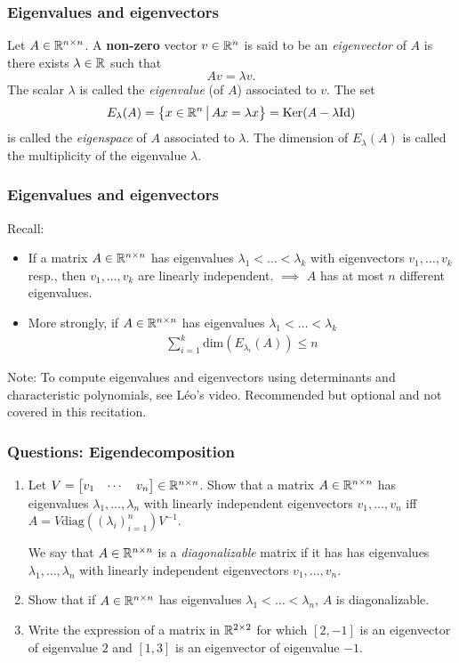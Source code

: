 \documentclass{beamer}
\begin{document}
\begin{frame}[t]
\frametitle{Eigenvalues and eigenvectors}
\begin{definition}\label{def:eigen}
	Let $A \in \mathbb{R}^{n \times n}$. A \textbf{non-zero} vector $v \in \mathbb{R}^n$ is said to be an \emph{eigenvector} of $A$ is there exists $\lambda \in \mathbb{R}$ such that
	$$
	A v = \lambda v.
	$$
	The scalar $\lambda$ is called the \emph{eigenvalue} (of $A$) associated to $v$. The set
	$$
	E_{\lambda}(A) = \big\{ x \in \mathbb{R}^n \, \big| \, Ax = \lambda x \big\} = {{\rm Ker}}(A-\lambda {{\rm Id}})
	$$
	is called the \emph{eigenspace} of $A$ associated to $\lambda$. The dimension of $E_{\lambda}(A)$ is called the multiplicity of the eigenvalue $\lambda$.
\end{definition}
\end{frame}

\begin{frame}[t]
\frametitle{Eigenvalues and eigenvectors}
Recall: 
\begin{itemize}
\item If a matrix $A \in \mathbb{R}^{n \times n}$ has eigenvalues $\lambda_1 < \dots < \lambda_k$ with eigenvectors $v_1, \dots, v_k$ resp., then $v_1, \dots, v_k$ are linearly independent. $\implies$ $A$ has at most $n$ different eigenvalues.
\item More strongly, if $A \in \mathbb{R}^{n \times n}$ has eigenvalues $\lambda_1 < \dots < \lambda_k$
\begin{align*}
\sum_{i=1}^k \text{dim}(E_{\lambda_i}(A)) \leq n
\end{align*}
\end{itemize}
Note: To compute eigenvalues and eigenvectors using determinants and characteristic polynomials, see L\'eo's video. Recommended but optional and not covered in this recitation.
\end{frame}

\begin{frame}[t]
\frametitle{Questions: Eigendecomposition}
\begin{enumerate}
\item Let $V = \begin{bmatrix} v_1 & \cdots & v_n \end{bmatrix} \in \mathbb{R}^{n \times n}$. Show that a matrix $A \in \mathbb{R}^{n \times n}$ has eigenvalues $\lambda_1, \dots, \lambda_n$ with linearly independent eigenvectors $v_1, \dots, v_n$ iff $A = V \text{diag}((\lambda_i)_{i=1}^n) V^{-1}$.
\begin{definition}
We say that $A \in \mathbb{R}^{n \times n}$ is a \emph{diagonalizable} matrix if it has has eigenvalues $\lambda_1, \dots, \lambda_n$ with linearly independent eigenvectors $v_1, \dots, v_n$.
\end{definition}
\item Show that if $A \in \mathbb{R}^{n \times n}$ has eigenvalues $\lambda_1 < \dots < \lambda_n$, $A$ is diagonalizable.
\item Write the expression of a matrix in $\mathbb{R}^{2 \times 2}$ for which $[2,-1]$ is an eigenvector of eigenvalue $2$ and $[1,3]$ is an eigenvector of eigenvalue $-1$.
\end{enumerate}
\end{frame}
\end{document}
